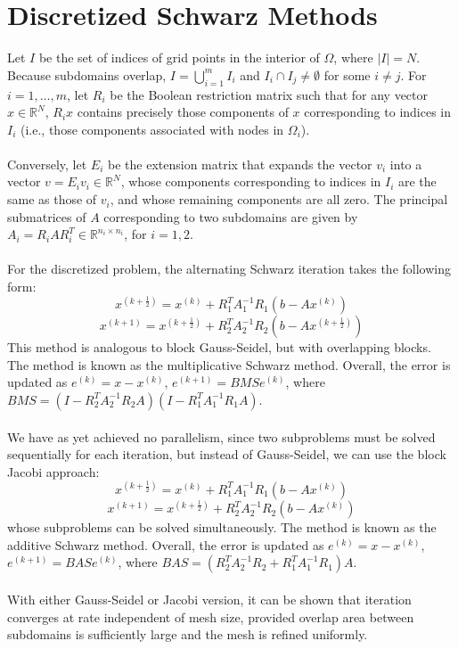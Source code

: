 \documentclass[11pt]{book}
\begin{document}
\section*{Discretized Schwarz Methods}
 Let $I$ be the set of indices of grid points in the interior of $\Omega$, where $|I|=N$. Because subdomains overlap, $I=\bigcup_{i=1}^m I_i$ and $I_i\cap I_j\neq \emptyset$ for some $i\neq j$. For $i=1,\dots,m$, let $R_i$ be the Boolean restriction matrix such that for any vector $x\in \mathbb{R}^N$, $R_ix$ contains precisely those components of $x$ corresponding to indices in $I_i$ (i.e., those components associated with nodes in $\Omega_i$). \\ \\
Conversely, let $E_i$ be the extension matrix that expands the vector $v_i$ into a vector $v=E_iv_i\in \mathbb{R}^N$, whose components corresponding to indices in $I_i$ are the same as those of $v_i$, and whose remaining components are all zero. The principal submatrices of $A$ corresponding to two subdomains are given by $A_i=R_iAR_i^T\in \mathbb{R}^{n_i\times n_i}$, for $i=1,2$.\\ \\
For the discretized problem, the alternating Schwarz iteration takes the following form: 
$$x^{(k+\frac{1}{2})}=x^{(k)}+R_1^TA_1^{-1}R_1(b-Ax^{(k)})$$
$$x^{(k+1)}=x^{(k+\frac{1}{2})}+R_2^TA_2^{-1}R_2(b-Ax^{(k+\frac{1}{2})})$$
This method is analogous to block Gauss-Seidel, but with overlapping blocks. The method is known as the multiplicative Schwarz method. Overall, the error is updated as $e^{(k)}=x-x^{(k)}$, $e^{(k+1)}=BMS e^{(k)}$, where $BMS=(I-R_2^TA_2^{-1}R_2A)(I-R_1^TA_1^{-1}R_1A)$. \\ \\
We have as yet achieved no parallelism, since two subproblems must be solved sequentially for each iteration, but instead of Gauss-Seidel, we can use the block Jacobi approach:
$$x^{(k+\frac{1}{2})}=x^{(k)}+R_1^TA_1^{-1}R_1(b-Ax^{(k)})$$
$$x^{(k+1)}=x^{(k+\frac{1}{2})}+R_2^TA_2^{-1}R_2(b-Ax^{(k)})$$
whose subproblems can be solved simultaneously. The method is known as the additive Schwarz method. Overall, the error is updated as $e^{(k)}=x-x^{(k)}$, $e^{(k+1)}=BAS e^{(k)}$, where $BAS=(R_2^TA_2^{-1}R_2 + R_1^TA_1^{-1}R_1)A$.\\ \\
With either Gauss-Seidel or Jacobi version, it can be shown 
that iteration converges at rate independent of mesh size, 
provided overlap area between subdomains is sufficiently 
large and the mesh is refined uniformly.
\end{document}
